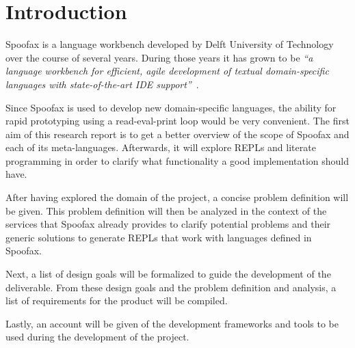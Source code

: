 \section*{Introduction}
\label{sec:introduction}

Spoofax is a language workbench developed by Delft University of Technology over
the course of several years. During those years it has grown to be \textit{``a
language workbench for efficient, agile development of textual domain-specific
languages with state-of-the-art IDE support''}~\cite{Kats10a}.

Since Spoofax is used to develop new domain-specific languages, the ability for
rapid prototyping using a read-eval-print loop would be very convenient.  The
first aim of this research report is to get a better overview of the scope of
Spoofax and each of its meta-languages. Afterwards, it will explore REPLs and
literate programming in order to clarify what functionality a good
implementation should have.

After having explored the domain of the project, a concise problem definition
will be given. This problem definition will then be analyzed in the context of
the services that Spoofax already provides to clarify potential problems and
their generic solutions to generate REPLs that work with languages defined in
Spoofax.

Next, a list of design goals will be formalized to guide the development of the
deliverable. From these design goals and the problem definition and analysis, a
list of requirements for the product will be compiled.

Lastly, an account will be given of the development frameworks and tools to be
used during the development of the project.

